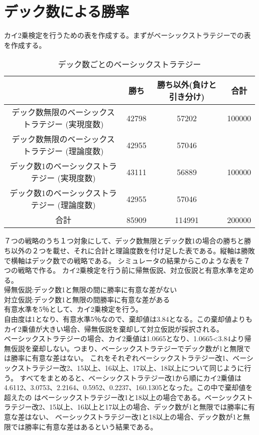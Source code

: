 \section{デック数による勝率}
カイ2乗検定を行うための表を作成する。まずがベーシックストラテジーでの表を作成する。
\begin{table}[H]
 \begin{center}
  \begin{tabular}{|c|c|c|c|}
    \hline
      & 勝ち & 勝ち以外(負けと引き分け) & 合計 \\
    \hline デック数無限のベーシックストラテジー (実現度数)& 42798 & 57202 & 100000 \\
            デック数無限のベーシックストラテジー (理論度数)& 42955 & 57046 &  \\
    \hline デック数1のベーシックストラテジー (実現度数)& 43111 & 56889 & 100000 \\
            デック数1のベーシックストラテジー (理論度数)& 42955 & 57046 &  \\
    \hline  合計 & 85909 & 114991 & 200000 \\
    \hline
  \end{tabular}
 \end{center}
 \caption{デック数ごとのベーシックストラテジー}
\end{table}
７つの戦略のうち１つ対象にして、デック数無限とデック数1の場合の勝ちと勝ち以外の２つを載せ、それに合計と理論度数を付け足した表である。縦軸は勝敗で横軸はデック数での戦略である。
シミュレータの結果からこのような表を７つの戦略で作る。
カイ2乗検定を行う前に帰無仮説、対立仮説と有意水準を定める。\\
帰無仮説:デック数1と無限の間に勝率に有意な差がない\\
対立仮説:デック数1と無限の間勝率に有意な差がある\\
有意水準を5％として、カイ2乗検定を行う。\\
自由度は1となり、有意水準5％なので、棄却値は3.84となる。この棄却値よりもカイ2乗値が大きい場合、帰無仮説を棄却して対立仮説が採択される。\\
ベーシックストラテジーの場合、カイ2乗値は1.0665となり、1.0665<3.84より帰無仮説を棄却しない。つまり、ベーシックストラテジーでデック数が1と無限では勝率に有意な差はない。
これをそれぞれベーシックストラテジー改1、ベーシックストラテジー改2、15以上、16以上、17以上、18以上について同じように行う。
すべてをまとめると、ベーシックストラテジー改1から順にカイ2乗値は4.6112、3.0753、2.2164、0.5952、0.2237、160.1305となった。この中で棄却値を超えたの
はベーシックストラテジー改1と18以上の場合である。ベーシックストラテジー改2、15以上、16以上と17以上の場合、デック数が1と無限では勝率に有意な差はない、
ベーシックストラテジー改1と18以上の場合、デック数が1と無限では勝率に有意な差はあるという結果である。
